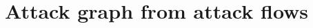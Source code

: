 \documentclass{cshonours}
\begin{document}
\section{Attack graph from attack flows}
\label{sec:technique-graph}

\end{document}
